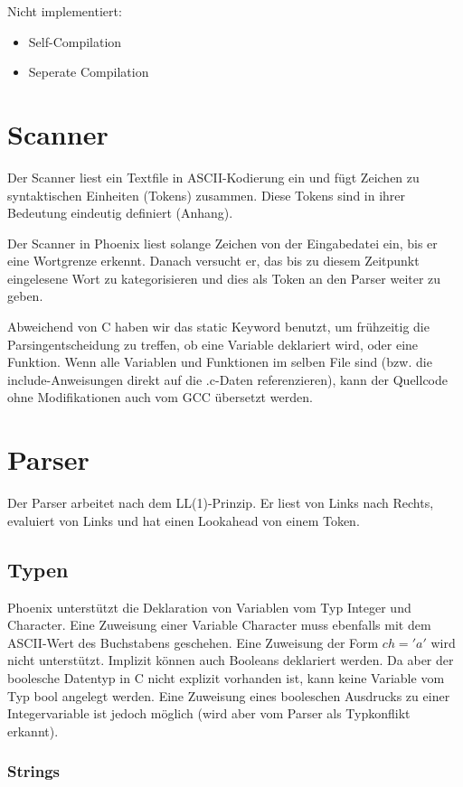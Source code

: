 \documentclass[a4paper,12pt]{article}
\begin{document}
	Nicht implementiert:
	\begin{itemize}
		\item Self-Compilation
		\item Seperate Compilation
	\end{itemize}

	\section{Scanner}
	Der Scanner liest ein Textfile in ASCII-Kodierung ein und fügt Zeichen zu syntaktischen Einheiten (Tokens) zusammen.
	Diese Tokens sind in ihrer Bedeutung eindeutig definiert (Anhang).

	Der Scanner in Phoenix liest solange Zeichen von der Eingabedatei ein, bis er eine Wortgrenze erkennt.
	Danach versucht er, das bis zu diesem Zeitpunkt eingelesene Wort zu kategorisieren und dies als Token an den Parser weiter zu geben.

	Abweichend von C haben wir das static Keyword benutzt, um frühzeitig die Parsingentscheidung zu treffen, ob eine Variable deklariert wird, oder eine Funktion.
	Wenn alle Variablen und Funktionen im selben File sind (bzw. die include-Anweisungen direkt auf die .c-Daten referenzieren), kann der Quellcode ohne Modifikationen auch vom GCC übersetzt werden.

	\section{Parser}
	Der Parser arbeitet nach dem LL(1)-Prinzip. Er liest von Links nach Rechts, evaluiert von Links und hat einen Lookahead von einem Token.

	\subsection{Typen}

	Phoenix unterstützt die Deklaration von Variablen vom Typ Integer und Character.
	Eine Zuweisung einer Variable Character muss ebenfalls mit dem ASCII-Wert des Buchstabens geschehen.
	Eine Zuweisung der Form $ch='a'$ wird nicht unterstützt.
	Implizit können auch Booleans deklariert werden.
	Da aber der boolesche Datentyp in C nicht explizit vorhanden ist, kann keine Variable vom Typ bool angelegt werden.
	Eine Zuweisung eines booleschen Ausdrucks zu einer Integervariable ist jedoch möglich (wird aber vom Parser als Typkonflikt erkannt).

	\subsubsection{Strings}
\end{document}
